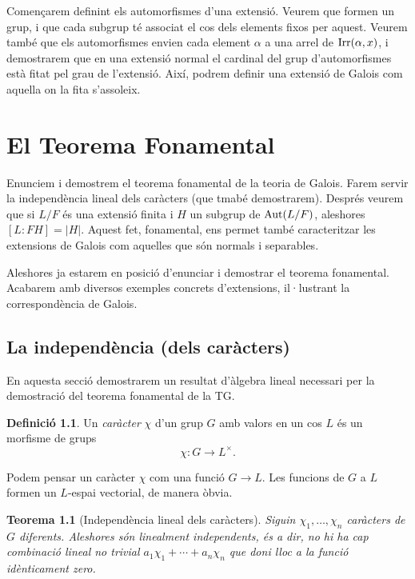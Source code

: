 \documentclass[
]{book}
\newtheorem{theorem}{Teorema}[chapter]
\theoremstyle{definition}
\newtheorem{definition}{Definició}[chapter]
\theoremstyle{definition}
\theoremstyle{definition}
\theoremstyle{definition}
\theoremstyle{remark}
\begin{document}
Començarem definint els automorfismes d'una extensió. Veurem que formen
un grup, i que cada subgrup té associat el cos dels elements fixos per aquest. Veurem també
que els automorfismes envien cada element \(\alpha\) a una arrel de \(\operatorname{Irr}(\alpha,x)\),
i demostrarem que en una extensió normal el cardinal del grup d'automorfismes està
fitat pel grau de l'extensió. Així, podrem definir una extensió de Galois com aquella
on la fita s'assoleix.

\hypertarget{el-teorema-fonamental}{%
\chapter{El Teorema Fonamental}\label{el-teorema-fonamental}}

Enunciem i demostrem el teorema fonamental de la teoria de Galois. Farem
servir la independència lineal dels caràcters (que tmabé demostrarem). Després veurem
que si \(L / F\) és una extensió finita i \(H\) un subgrup de \(\operatorname{Aut}(L/F)\), aleshores
\([L \colon FH] = |H|\). Aquest fet, fonamental, ens permet també caracteritzar
les extensions de Galois com aquelles que són normals i separables.

Aleshores ja estarem en posició d'enunciar i demostrar el teorema fonamental. Acabarem
amb diversos exemples concrets d'extensions, il·lustrant la correspondència de Galois.

\hypertarget{la-independuxe8ncia-dels-caruxe0cters}{%
\section{La independència (dels caràcters)}\label{la-independuxe8ncia-dels-caruxe0cters}}

En aquesta secció demostrarem un resultat d'àlgebra lineal necessari per la demostració del teorema fonamental de la TG.

\begin{definition}
\protect\hypertarget{def:caracter}{}\label{def:caracter}Un \emph{caràcter} \(\chi\) d'un grup \(G\) amb valors en un cos \(L\) és un morfisme de grups
\[
\chi \colon G \to L^\times.
\]
\end{definition}

Podem pensar un caràcter \(\chi\) com una funció \(G\to L\). Les funcions de \(G\) a \(L\) formen un \(L\)-espai vectorial, de manera òbvia.

\begin{theorem}[Independència lineal dels caràcters]
\protect\hypertarget{thm:caracters-li}{}\label{thm:caracters-li}Siguin \(\chi_1,\ldots,\chi_n\) caràcters de \(G\) diferents. Aleshores són linealment independents, és a dir, no hi ha
cap combinació lineal no trivial \(a_1\chi_1+\cdots+a_n\chi_n\) que doni lloc a la funció idènticament zero.
\end{theorem}
\end{document}
